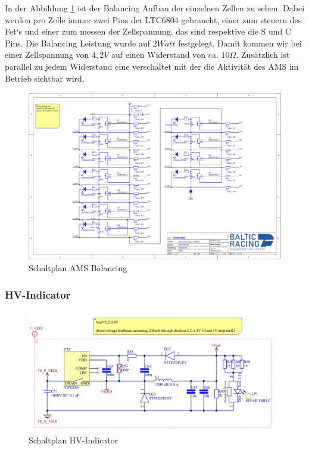 In der Abbildung \ref{fig:amsbalancingschematic} ist der Balancing Aufbau der einzelnen Zellen zu sehen. Dabei werden pro Zelle immer zwei Pins der LTC6804 gebraucht, einer zum steuern des Fet`s und einer zum messen der Zellspannung. das sind respektive die S und C Pins. Die Balancing Leistung wurde auf \ensuremath{2 Watt} festgelegt. Damit kommen wir bei einer Zellspannung von \ensuremath{4,2V} auf einen Widerstand von ca. \ensuremath{10 \Omega}. Zusätzlich ist parallel zu jedem Widerstand eine  verschaltet mit der die Aktivität des \ac{AMS} im Betrieb sichtbar wird.

\begin{figure}
	\centering
	\includegraphics[width=0.7\linewidth]{bilder/AMS_Balancing_Schematic}
	\caption{Schaltplan \ac{AMS} Balancing}
	\label{fig:amsbalancingschematic}
\end{figure}

\FloatBarrier
\subsubsection{\ac{HV}-Indicator}

\begin{figure}
	\centering
	\includegraphics[width=0.7\linewidth]{bilder/HV_indicator_schematic}
	\caption{Schaltplan \ac{HV}-Indicator}
	\label{fig:hvindicatorschematic}
\end{figure}

